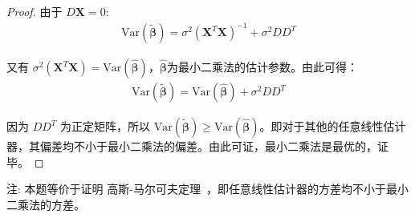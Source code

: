 \documentclass[UTF8]{article} %
\newcommand{\TildeBeta}{\tilde{\boldsymbol{\beta}}}
\newcommand{\HatBeta}{\hat{\boldsymbol{\beta}}}
\begin{document}
\begin{proof}
        由于 $D \mathbf{X} = 0$:
        \begin{align}
            \mathrm{Var}(\TildeBeta) =  \sigma^{2}\left(\mathbf{X}^T \mathbf{X}\right)^{-1} + \sigma^{2} D D^T
        \end{align}

        又有 $\sigma^{2} (\mathbf{X}^T \mathbf{X}) = \mathrm{Var}(\HatBeta)$，$\HatBeta$为最小二乘法的估计参数。由此可得：
        \begin{align}
            \mathrm{Var}(\TildeBeta) = \mathrm{Var}(\HatBeta) + \sigma^{2} D D^T
        \end{align}

        因为 $D D^T$ 为正定矩阵，所以 $\mathrm{Var}(\TildeBeta) \geq \mathrm{Var}(\HatBeta)$。即对于其他的任意线性估计器，其偏差均不小于最小二乘法的偏差。由此可证，最小二乘法是最优的，证毕。
    \end{proof}

    注: 本题等价于证明 高斯-马尔可夫定理~\cite{wiki}，即任意线性估计器的方差均不小于最小二乘法的方差。
    
    
\end{document}

